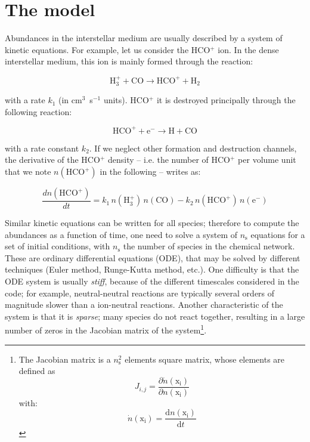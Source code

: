 \documentclass[a4paper,12pt]{article}
\newcommand{\conc}[1]{n(\mathrm{#1})}
\begin{document}
\section{The model}
\label{sec:model}

Abundances in the interstellar medium are usually described by a
system of kinetic equations. For example, let us consider the
HCO$^{+}$ ion. In the dense interstellar medium, this ion is mainly
formed through the reaction:

\begin{equation}
  \mathrm{H_{3}^{+} + CO \rightarrow HCO^{+} + H_{2}}
  \label{eq:hcop-formation}
\end{equation}

\noindent
with a rate $k_{1}$ (in cm$^{3}$~s$^{-1}$ units). HCO$^{+}$ it is
destroyed principally through the following reaction:

\begin{equation}
  \mathrm{HCO^{+} + e^{-} \rightarrow H + CO}
  \label{eq:hcop-destruction}
\end{equation}

\noindent
with a rate constant $k_{2}$. If we neglect other formation and
destruction channels, the derivative of the HCO$^{+}$ density --
i.e. the number of HCO$^{+}$ per volume unit that we note
$\conc{HCO^{+}}$ in the following -- writes as:

\begin{equation}
  \frac{d\conc{HCO^{+}}}{dt} = k_{1} \, \conc{H_{3}^{+}} \, \conc{CO}
  - k_{2} \, \conc{HCO^{+}} \, \conc{e^{-}}
\end{equation}

Similar kinetic equations can be written for all species; therefore to
compute the abundances as a function of time, one need to solve a
system of $n_\mathrm{s}$ equations for a set of initial conditions,
with $n_\mathrm{s}$ the number of species in the chemical
network. These are ordinary differential equations (ODE), that may be
solved by different techniques (Euler method, Runge-Kutta method,
etc.). One difficulty is that the ODE system is usually \emph{stiff},
because of the different timescales considered in the code; for
example, neutral-neutral reactions are typically several orders of
magnitude slower than a ion-neutral reactions. Another characteristic
of the system is that it is \emph{sparse}; many species do not react
together, resulting in a large number of zeros in the Jacobian matrix
of the system\footnote{The Jacobian matrix is a $n_\mathrm{s}^2$
  elements square matrix, whose elements are defined as
  \begin{equation}
     J_{i,j} = \frac{\partial
       \dot\conc{x_{i}}}{\partial \conc{x_{i}}}
   \end{equation}
   \noindent
   with:
   \begin{equation}
     \dot\conc{x_{i}} = \frac{\mathrm{d} \conc{x_{i}}}{\mathrm{d}t}
   \end{equation}}.
\end{document}

